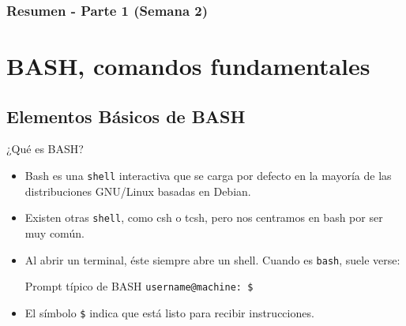 \documentclass[10pt]{beamer}
\begin{document}
\myfront{}

\begin{frame}
  \titlepage
\end{frame}

\begin{frame}
  \frametitle{Resumen - Parte 1 (Semana 2)}
  \tableofcontents
\end{frame}


\section{BASH, comandos fundamentales}

\subsection{Elementos B\'asicos de BASH}

\begin{frame}{¿Qué es BASH?}
	\begin{itemize}
		\item Bash es una \texttt{shell} interactiva que se carga por defecto en la mayoría de las distribuciones GNU/Linux basadas en Debian.
		\item Existen otras \texttt{shell}, como csh o tcsh, pero nos centramos en bash por ser muy común.
		\item Al abrir un terminal, éste siempre abre un shell. Cuando es \texttt{bash}, suele verse:
        \begin{block}{Prompt típico de BASH}
        \texttt{username@machine:~\$}
        \end{block}
        \item El símbolo \texttt{\$} indica que está listo para recibir instrucciones.
	\end{itemize}
\end{frame}
\end{document}
